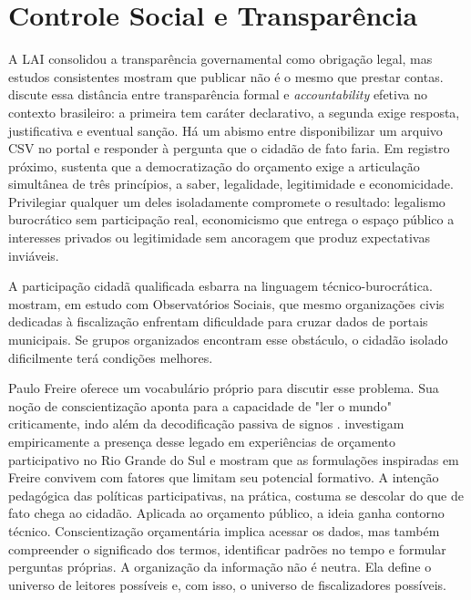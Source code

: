 \section{Controle Social e Transparência}

A LAI consolidou a transparência governamental como obrigação legal, mas estudos consistentes mostram que publicar não é o mesmo que prestar contas.  discute essa distância entre transparência formal e \textit{accountability} efetiva no contexto brasileiro: a primeira tem caráter declarativo, a segunda exige resposta, justificativa e eventual sanção. Há um abismo entre disponibilizar um arquivo CSV no portal e responder à pergunta que o cidadão de fato faria. Em registro próximo,  sustenta que a democratização do orçamento exige a articulação simultânea de três princípios, a saber, legalidade, legitimidade e economicidade. Privilegiar qualquer um deles isoladamente compromete o resultado: legalismo burocrático sem participação real, economicismo que entrega o espaço público a interesses privados ou legitimidade sem ancoragem que produz expectativas inviáveis.

A participação cidadã qualificada esbarra na linguagem técnico-burocrática.  mostram, em estudo com Observatórios Sociais, que mesmo organizações civis dedicadas à fiscalização enfrentam dificuldade para cruzar dados de portais municipais. Se grupos organizados encontram esse obstáculo, o cidadão isolado dificilmente terá condições melhores.

Paulo Freire oferece um vocabulário próprio para discutir esse problema. Sua noção de conscientização aponta para a capacidade de "ler o mundo" criticamente, indo além da decodificação passiva de signos \cite{freire1967liberdade,freire1996autonomia}.  investigam empiricamente a presença desse legado em experiências de orçamento participativo no Rio Grande do Sul e mostram que as formulações inspiradas em Freire convivem com fatores que limitam seu potencial formativo. A intenção pedagógica das políticas participativas, na prática, costuma se descolar do que de fato chega ao cidadão. Aplicada ao orçamento público, a ideia ganha contorno técnico. Conscientização orçamentária implica acessar os dados, mas também compreender o significado dos termos, identificar padrões no tempo e formular perguntas próprias. A organização da informação não é neutra. Ela define o universo de leitores possíveis e, com isso, o universo de fiscalizadores possíveis.

